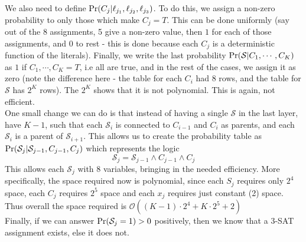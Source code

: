 We also need to define $\text{Pr}(C_j|\ell_{j_1}, \ell_{j_2}, \ell_{j_3})$. To do this, we assign a non-zero probability to only those which make $C_j=T$. This can be done uniformly (say out of the 8 assignments, 5 give a non-zero value, then $1$ for each of those assignments, and $0$ to rest - this is done because each $C_j$ is a deterministic function of the literals). Finally, we write the last probability $\text{Pr}(\mathcal S|C_1, \cdots, C_K)$ as $1$ if $C_1, \cdots, C_K = T$, i.e all are true, and in the rest of the cases, we assign it as zero (note the difference here - the table for each $C_i$ had 8 rows, and the table for $\mathcal S$ has $2^K$ rows). The $2^K$ shows that it is not polynomial. This is again, not efficient. \\
One small change we can do is that instead of having a single $\mathcal S$ in the last layer, have $K-1$, such that each $\mathcal{S}_i$ is connected to $C_{i-1}$ and $C_i$ as parents, and each $\mathcal{S}_i$ is a parent of $\mathcal{S}_{i+1}$. This allows us to create the probability table as $\text{Pr}(\mathcal{S}_j | \mathcal{S}_{j-1}, C_{j-1}, C_j)$ which represents the logic
\begin{equation}
	\mathcal{S}_j =  \mathcal{S}_{j-1} \land C_{j-1} \land C_j 
\end{equation} 
This allows each $\mathcal{S}_j$ with 8 variables, bringing in the needed efficiency. More specifically, the space required now is polynomial, since each $S_j$ requires only $2^4$ space, each $C_j$ requires $2^5$ space and each $x_j$ requires just constant (2) space. Thus overall the space required is $\mathcal{O}((K-1)\cdot2^4 + K\cdot 2^5+2)$
\\
Finally, if we can answer $\text{Pr}(\mathcal{S}_j=1) > 0$ positively, then we know that a $3$-SAT assignment exists, else it does not.
